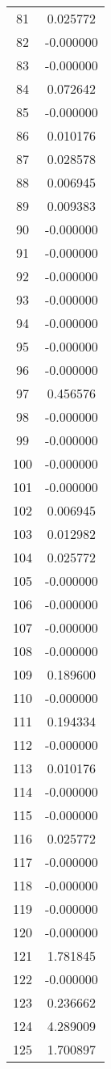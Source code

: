 \documentclass[12pt]{article}
\begin{document}
\begin{longtable}{@{}cc@{}}
81 & 0.025772 \\
82 & -0.000000 \\
83 & -0.000000 \\
84 & 0.072642 \\
85 & -0.000000 \\
86 & 0.010176 \\
87 & 0.028578 \\
88 & 0.006945 \\
89 & 0.009383 \\
90 & -0.000000 \\
91 & -0.000000 \\
92 & -0.000000 \\
93 & -0.000000 \\
94 & -0.000000 \\
95 & -0.000000 \\
96 & -0.000000 \\
97 & 0.456576 \\
98 & -0.000000 \\
99 & -0.000000 \\
100 & -0.000000 \\
101 & -0.000000 \\
102 & 0.006945 \\
103 & 0.012982 \\
104 & 0.025772 \\
105 & -0.000000 \\
106 & -0.000000 \\
107 & -0.000000 \\
108 & -0.000000 \\
109 & 0.189600 \\
110 & -0.000000 \\
111 & 0.194334 \\
112 & -0.000000 \\
113 & 0.010176 \\
114 & -0.000000 \\
115 & -0.000000 \\
116 & 0.025772 \\
117 & -0.000000 \\
118 & -0.000000 \\
119 & -0.000000 \\
120 & -0.000000 \\
121 & 1.781845 \\
122 & -0.000000 \\
123 & 0.236662 \\
124 & 4.289009 \\
125 & 1.700897 \\

\end{longtable}
\end{document}
